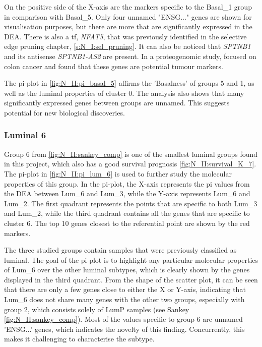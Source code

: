On the positive side of the X-axis are the markers specific to the Basal\_1 group in comparison with Basal\_5. Only four unnamed "ENSG..." genes are shown for visualisation purposes, but there are more that are significantly expressed in the DEA. There is also a \acrlong{tf}, \textit{NFAT5}, that was previously identified in the selective edge pruning chapter, \cref{s:N_I:sel_pruning}. It can also be noticed that \textit{SPTNB1} and its antisense \textit{SPTNB1-AS2} are present. In a proteogenomic study, \citep{Fanayan2013-uj} focused on colon cancer and found that these genes are potential tumour markers.

The pi-plot in \cref{fig:N_II:pi_basal_5} affirms the 'Basalness' of groups 5 and 1, as well as the luminal properties of cluster 0. The analysis also shows that many significantly expressed genes between groups are unnamed. This suggests potential for new biological discoveries.



\subsubsection*{Luminal 6} \label{s:N_II:lum_6}

Group 6 from \cref{fig:N_II:sankey_comp} is one of the smallest luminal groups found in this project, which also has a good survival prognosis \cref{fig:N_II:survival_K_7}. The pi-plot in \cref{fig:N_II:pi_lum_6} is used to further study the molecular properties of this group. In the pi-plot, the X-axis represents the pi values from the DEA between Lum\_6 and Lum\_3, while the Y-axis represents Lum\_6 and Lum\_2. The first quadrant represents the points that are specific to both Lum\_3 and Lum\_2, while the third quadrant contains all the genes that are specific to cluster 6. The top 10 genes closest to the referential point are shown by the red markers.


The three studied groups contain samples that were previously classified as luminal. The goal of the pi-plot is to highlight any particular molecular properties of Lum\_6 over the other luminal subtypes, which is clearly shown by the genes displayed in the third quadrant. From the shape of the scatter plot, it can be seen that there are only a few genes close to either the X or Y-axis, indicating that Lum\_6 does not share many genes with the other two groups, especially with group 2, which consists solely of LumP samples (see Sankey \cref{fig:N_II:sankey_comp}). Most of the values specific to group 6 are unnamed 'ENSG...' genes, which indicates the novelty of this finding. Concurrently, this makes it challenging to characterise the subtype.



